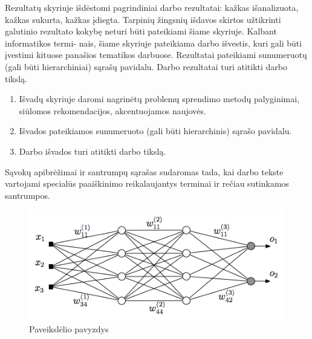 \documentclass[
]{VUMIFPSbakalaurinis}
\begin{document}
Rezultatų skyriuje išdėstomi pagrindiniai darbo rezultatai: kažkas išanalizuota,
kažkas sukurta, kažkas įdiegta. Tarpinių žingsnių išdavos skirtos užtikrinti galutinio
rezultato kokybę neturi būti pateikiami šiame skyriuje. Kalbant informatikos termi-
nais, šiame skyriuje pateikiama darbo išvestis, kuri gali būti įvestimi kituose panašios
tematikos darbuose. Rezultatai pateikiami sunumeruotų (gali būti hierarchiniai) sąrašų
pavidalu. Darbo rezultatai turi atitikti darbo tikslą.

\begin{enumerate}[labelindent=0pt]
    \item Išvadų skyriuje daromi nagrinėtų problemų sprendimo metodų palyginimai, siūlomos
rekomendacijos, akcentuojamos naujovės.
    \item Išvados pateikiamos sunumeruoto (gali būti hierarchinis) sąrašo pavidalu.
    \item Darbo išvados turi atitikti darbo tikslą.
\end{enumerate}

\printbibliography[heading=bibintoc]  %

Sąvokų apibrėžimai ir santrumpų sąrašas sudaromas tada, kai darbo tekste
vartojami specialūs paaiškinimo reikalaujantys terminai ir rečiau sutinkamos
santrumpos.


\begin{figure}[H]
    \centering
    \includegraphics[scale=0.5]{img/MLP}
    \caption{Paveikslėlio pavyzdys}
    \label{img:mlp}
\end{figure}
\end{document}
